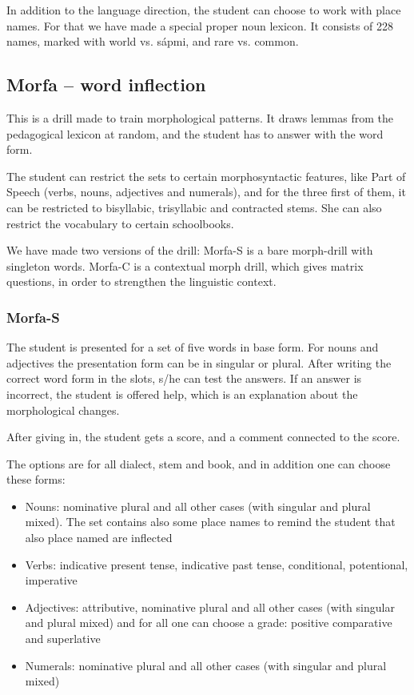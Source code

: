 \documentclass[a4paper,12pt]{article}
\begin{document}
\vspace{0.5cm}
In addition to the language direction, the student can choose to work with place names. For that we have made a special proper noun lexicon. It consists of 228 names, marked with world vs. sápmi, and rare vs. common. 


\subsection{Morfa -- word inflection}
This is a drill made to train morphological patterns. It draws lemmas from the pedagogical lexicon at random, and the student has to answer with the word form. 

The student can restrict the sets to certain morphosyntactic features, like Part of Speech (verbs, nouns, adjectives and numerals), and for the three first of them, it can be restricted to bisyllabic, trisyllabic and contracted stems. She can also restrict the vocabulary to certain schoolbooks.

We have made two versions of the drill: Morfa-S is a bare morph-drill with singleton words. Morfa-C is a contextual morph drill, which gives matrix questions, in order to strengthen the linguistic context.

\subsubsection{Morfa-S}
The student is presented for a set of five words in base form. For nouns and adjectives the presentation form can be in singular or plural. After writing the correct word form in the slots, s/he can test the answers. If an answer is incorrect, the student is offered help, which is an explanation about the morphological changes.

After giving in, the student gets a score, and a comment connected to the score.

The options are for all dialect, stem and book, and in addition one can choose these forms:
\begin{itemize}
\item Nouns: nominative plural and all other cases (with singular and plural mixed). The set contains also some place names to remind the student that also place named are inflected
\item Verbs: indicative present tense, indicative past tense, conditional, potentional, imperative
\item Adjectives: attributive, nominative plural and all other cases (with singular and plural mixed) and for all one can choose a grade: positive comparative and superlative
\item Numerals: nominative plural and all other cases (with singular and plural mixed)
\end{itemize}
\vspace{0.5cm}
\end{document}
